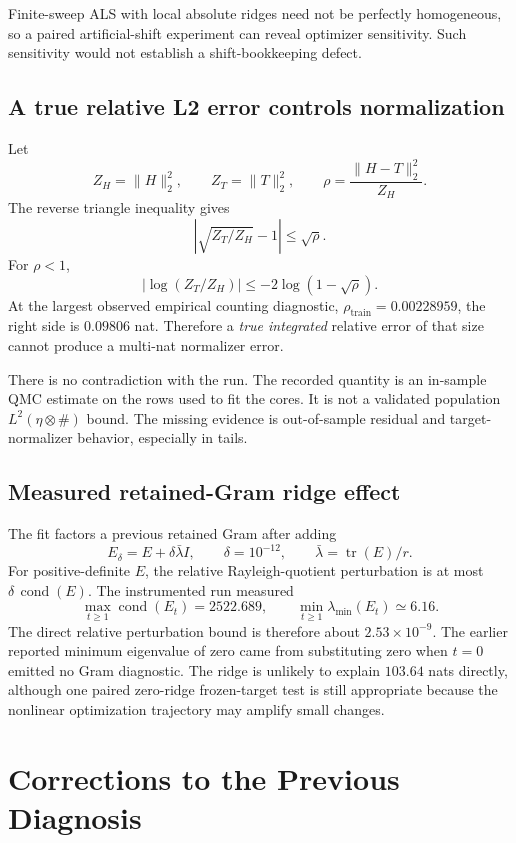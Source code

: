\documentclass[11pt]{article}
\begin{document}
Finite-sweep ALS with local absolute ridges need not be perfectly homogeneous,
so a paired artificial-shift experiment can reveal optimizer sensitivity.
Such sensitivity would not establish a shift-bookkeeping defect.

\subsection{A true relative L2 error controls normalization}

Let
\[
Z_H=\|H\|_2^2,\qquad
Z_T=\|T\|_2^2,\qquad
\rho=\frac{\|H-T\|_2^2}{Z_H}.
\]
The reverse triangle inequality gives
\[
\left|\sqrt{Z_T/Z_H}-1\right|\leq\sqrt{\rho}.
\]
For $\rho<1$,
\begin{equation}\label{eq:l2-bound}
\left|\log(Z_T/Z_H)\right|
\leq-2\log(1-\sqrt{\rho}).
\end{equation}
At the largest observed empirical counting diagnostic,
$\rho_{\mathrm{train}}=0.00228959$, the right side is $0.09806$ nat.
Therefore a \emph{true integrated} relative error of that size cannot produce
a multi-nat normalizer error.

There is no contradiction with the run. The recorded quantity is an in-sample
QMC estimate on the rows used to fit the cores. It is not a validated
population $L^2(\eta\otimes\#)$ bound. The missing evidence is out-of-sample
residual and target-normalizer behavior, especially in tails.

\subsection{Measured retained-Gram ridge effect}

The fit factors a previous retained Gram after adding
\[
E_\delta=E+\delta\bar\lambda I,\qquad
\delta=10^{-12},\qquad
\bar\lambda=\operatorname{tr}(E)/r.
\]
For positive-definite $E$, the relative Rayleigh-quotient perturbation is at
most $\delta\,\operatorname{cond}(E)$. The instrumented run measured
\[
\max_{t\geq1}\operatorname{cond}(E_t)=2522.689,
\qquad
\min_{t\geq1}\lambda_{\min}(E_t)\simeq6.16.
\]
The direct relative perturbation bound is therefore about $2.53\times10^{-9}$.
The earlier reported minimum eigenvalue of zero came from substituting zero
when $t=0$ emitted no Gram diagnostic. The ridge is unlikely to explain
$103.64$ nats directly, although one paired zero-ridge frozen-target test is
still appropriate because the nonlinear optimization trajectory may amplify
small changes.

\section{Corrections to the Previous Diagnosis}
\end{document}
